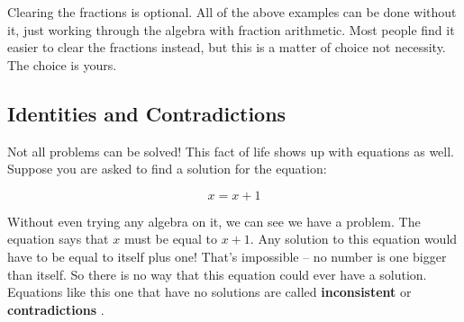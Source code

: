 
Clearing the fractions is optional. All of the above examples can be done without it, just working through the algebra with fraction arithmetic. Most people find it easier to clear the fractions instead, but this is a matter of choice not necessity. The choice is yours.

%
%

\subsection{Identities and Contradictions}

Not all problems can be solved! This fact of life shows up with equations as well. Suppose you are asked to find a solution for the equation:

$$ x = x + 1 $$

Without even trying any algebra on it, we can see we have a problem. The equation says that $x$ must be equal to $x+1$. Any solution to this equation would have to be equal to itself plus one! That’s impossible – no number is one bigger than itself. So there is no way that this equation could ever have a solution. Equations like this one that have no solutions are called \textbf{inconsistent}  or \textbf{contradictions} .

